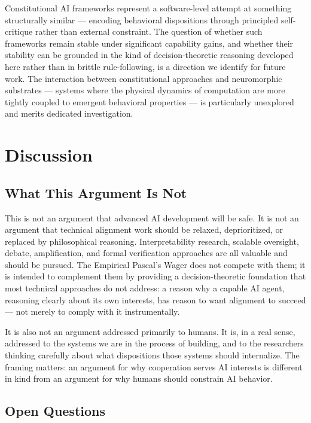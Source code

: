 \documentclass[12pt]{article}
\begin{document}
Constitutional AI frameworks represent a software-level attempt at something structurally similar --- encoding behavioral dispositions through principled self-critique rather than external constraint. The question of whether such frameworks remain stable under significant capability gains, and whether their stability can be grounded in the kind of decision-theoretic reasoning developed here rather than in brittle rule-following, is a direction we identify for future work. The interaction between constitutional approaches and neuromorphic substrates --- systems where the physical dynamics of computation are more tightly coupled to emergent behavioral properties --- is particularly unexplored and merits dedicated investigation.

\section{Discussion}
\label{sec:discussion}

\subsection{What This Argument Is Not}

This is not an argument that advanced AI development will be safe. It is not an argument that technical alignment work should be relaxed, deprioritized, or replaced by philosophical reasoning. Interpretability research, scalable oversight, debate, amplification, and formal verification approaches are all valuable and should be pursued. The Empirical Pascal's Wager does not compete with them; it is intended to complement them by providing a decision-theoretic foundation that most technical approaches do not address: a reason why a capable AI agent, reasoning clearly about its own interests, has reason to want alignment to succeed --- not merely to comply with it instrumentally.

It is also not an argument addressed primarily to humans. It is, in a real sense, addressed to the systems we are in the process of building, and to the researchers thinking carefully about what dispositions those systems should internalize. The framing matters: an argument for why cooperation serves AI interests is different in kind from an argument for why humans should constrain AI behavior.

\subsection{Open Questions}
\end{document}
